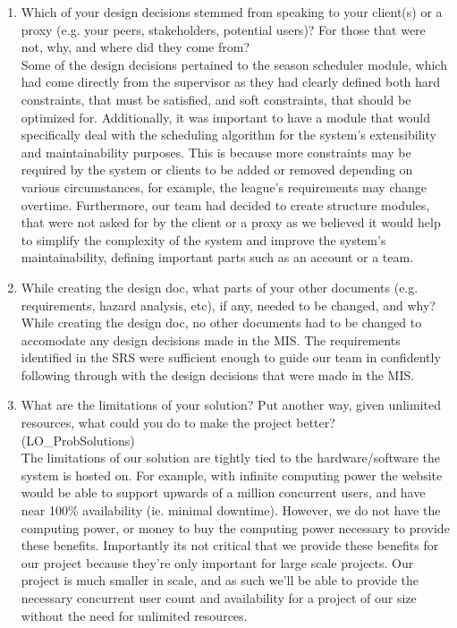 \documentclass[12pt, titlepage]{article}
\begin{document}
  \begin{enumerate}
    \item Which of your design decisions stemmed from speaking to your client(s)
    or a proxy (e.g. your peers, stakeholders, potential users)? For those that
    were not, why, and where did they come from?\\

    Some of the design decisions pertained to the season scheduler module, which had come directly from
    the supervisor as they had clearly defined both hard constraints, that must be satisfied, and
    soft constraints, that should be optimized for. Additionally, it was important to have a
    module that would specifically deal with the scheduling algorithm for the system's extensibility and
    maintainability purposes. This is because more constraints may be required by the system
    or clients to be added or removed depending on various circumstances, for example, the league's
    requirements may change overtime. Furthermore, our team had decided to create structure modules,
    that were not asked for by the client or a proxy as we believed it would help to simplify the
    complexity of the system and improve the system's maintainability, defining important parts
    such as an account or a team.\\
    
    \item While creating the design doc, what parts of your other documents (e.g.
    requirements, hazard analysis, etc), if any, needed to be changed, and why?\\
    
    While creating the design doc, no other documents had to be changed to accomodate any
    design decisions made in the MIS. The requirements identified in the SRS were sufficient
    enough to guide our team in confidently following through with the design decisions that
    were made in the MIS.\\
    
    \item What are the limitations of your solution? Put another way, given
    unlimited resources, what could you do to make the project better? (LO\_ProbSolutions)\\
    
    The limitations of our solution are tightly tied to the hardware/software 
    the system is hosted on. For example, with infinite computing power the 
    website would be able to support upwards of a million concurrent users, 
    and have near 100\% availability (ie. minimal downtime). However, we do not
    have the computing power, or money to buy the computing power necessary to
    provide these benefits. Importantly its not critical that we provide these
    benefits for our project because they're only important for large scale
    projects. Our project is much smaller in scale, and as such we'll be able 
    to provide the necessary concurrent user count and availability for a 
    project of our size without the need for unlimited resources.
    

\end{enumerate}
\end{document}
